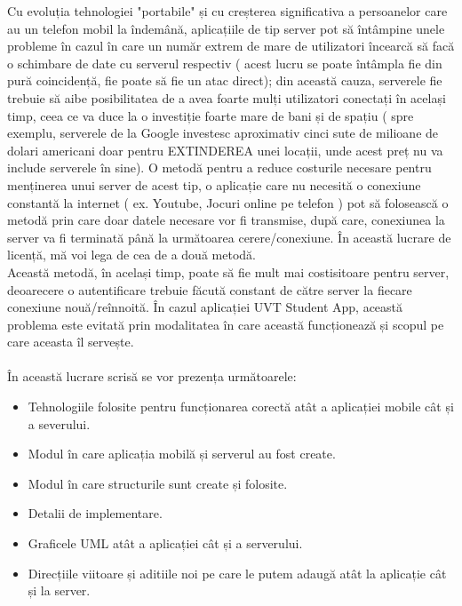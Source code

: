 \documentclass{article}
\begin{document}
		Cu evoluția tehnologiei "portabile" și cu creșterea significativa a persoanelor care au un telefon mobil la îndemână, aplicațiile de tip server pot să întâmpine unele probleme în cazul în care un număr extrem de mare de utilizatori încearcă să facă o schimbare de date cu serverul respectiv ( acest lucru se poate întâmpla fie din pură coincidență, fie poate să fie un atac direct); din această cauza, serverele fie trebuie să aibe posibilitatea de a avea foarte mulți utilizatori conectați în același timp, ceea ce va duce la o investiție foarte mare de bani și de spațiu ( spre exemplu, serverele de la Google investesc aproximativ cinci sute de milioane de dolari americani doar pentru EXTINDEREA unei locații, unde acest preț nu va include serverele în sine). O metodă pentru a reduce costurile necesare pentru menținerea unui server de acest tip, o aplicație care nu necesită o conexiune constantă la internet ( ex. Youtube, Jocuri online pe telefon ) pot să folosească o metodă prin care doar datele necesare vor fi transmise, după care, conexiunea la server va fi terminată până la următoarea cerere/conexiune. În această lucrare de licență, mă voi lega de cea de a două metodă. \\ 
		
		Această metodă, în același timp, poate să fie mult mai costisitoare pentru server, deoarecere o autentificare trebuie făcută constant de către server la fiecare conexiune nouă/reînnoită. În cazul aplicației UVT Student App, această problema este evitată prin modalitatea în care această funcționează și scopul pe care aceasta îl servește. \\ \\
	
		  În această lucrare scrisă se vor prezența următoarele:
		\begin{itemize}
			\item Tehnologiile folosite pentru funcționarea corectă atât a aplicației mobile cât și a severului.
			\item Modul în care aplicația mobilă și serverul au fost create.
			\item Modul în care structurile sunt create și folosite.
			\item Detalii de implementare.
			\item Graficele UML atât a aplicației cât și a serverului.
			\item Direcțiile viitoare și aditiile noi pe care le putem adaugă atât la aplicație cât și la server.
		\end{itemize}
\end{document}
